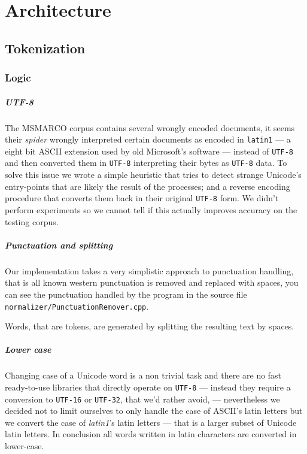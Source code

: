 
\chapter{Architecture}

\section{Tokenization}

\subsection{Logic}

\paragraph{UTF-8} 
The MSMARCO corpus contains several wrongly encoded documents, it seems their \textit{spider} wrongly interpreted certain documents as encoded in \texttt{latin1} --- a eight bit ASCII extension used by old Microsoft's software --- instead of \texttt{UTF-8} and then converted them in \texttt{UTF-8} interpreting their bytes as \texttt{UTF-8} data. To solve this issue we wrote a simple heuristic that tries to detect strange Unicode's entry-points that are likely the result of the processes; and a reverse encoding procedure that converts them back in their original \texttt{UTF-8} form. We didn't perform experiments so we cannot tell if this actually improves accuracy on the testing corpus.

\paragraph{Punctuation and splitting}
Our implementation takes a very simplistic approach to punctuation handling, that is all known western punctuation is removed and replaced with spaces, you can see the punctuation handled by the program in the source file \texttt{normalizer/PunctuationRemover.cpp}.

Words, that are tokens, are generated by splitting the resulting text by spaces.

\paragraph{Lower case}
Changing case of a Unicode word is a non trivial task and there are no fast ready-to-use libraries that directly operate on \texttt{UTF-8} --- instead they require a conversion to \texttt{UTF-16} or \texttt{UTF-32}, that we'd rather avoid, --- nevertheless we decided not to limit ourselves to only handle the case of ASCII's latin letters but we convert the case of \textit{latin1}'s latin letters --- that is a larger subset of Unicode latin letters. In conclusion all words written in latin characters are converted in lower-case.

